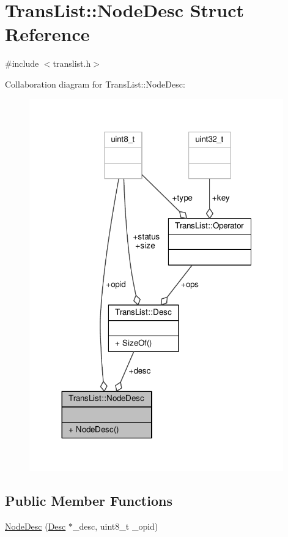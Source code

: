 \hypertarget{structTransList_1_1NodeDesc}{\section{Trans\-List\-:\-:Node\-Desc Struct Reference}
\label{structTransList_1_1NodeDesc}
}


{\ttfamily \#include $<$translist.\-h$>$}



Collaboration diagram for Trans\-List\-:\-:Node\-Desc\-:
\nopagebreak
\begin{figure}[H]
\begin{center}
\leavevmode
\includegraphics[width=311pt]{structTransList_1_1NodeDesc__coll__graph}
\end{center}
\end{figure}
\subsection*{Public Member Functions}
\begin{DoxyCompactItemize}
\item 
\hyperlink{structTransList_1_1NodeDesc_aef3e5777417a0dd5c8be01a79d440db3}{Node\-Desc} (\hyperlink{structTransList_1_1Desc}{Desc} $\ast$\-\_\-desc, uint8\-\_\-t \-\_\-opid)
\end{DoxyCompactItemize}
